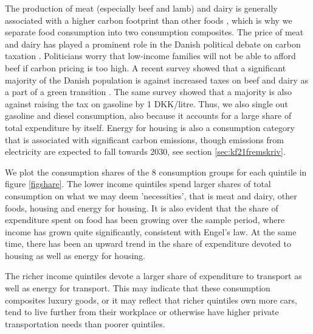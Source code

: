 The production of meat (especially beef and lamb) and dairy is generally associated with a higher carbon footprint than other foods \citep{denstoreklimadatabase}, which is why we separate food consumption into two consumption composites. The price of meat and dairy has played a prominent role in the Danish political debate on carbon taxation \citep{kodsovsellerkaos}.  Politicians worry that low-income families will not be able to afford beef if carbon pricing is too high. A recent survey showed that a significant majority of the Danish population is against increased taxes on beef and dairy as a part of a green transition \citep{megafonpolitiken}. The same survey showed that a majority is also against raising the tax on gasoline by 1 DKK/litre. Thus, we also single out gasoline and diesel consumption, also because it accounts for a large share of total expenditure by itself. Energy for housing is also a consumption category that is associated with significant carbon emissions, though emissions from electricity are expected to fall towards 2030, see section \ref{sec:kf21fremskriv}.

We plot the consumption shares of the 8 consumption groups for each quintile in figure \ref{figshare}. The lower income quintiles spend larger shares of total consumption on what we may deem 'necessities', that is meat and dairy, other foods, housing and energy for housing. It is also evident that the share of expenditure spent on food has been growing over the sample period, where income has grown quite significantly, consistent with Engel's law. At the same time, there has been an upward trend in the share of expenditure devoted to housing as well as energy for housing.

The richer income quintiles devote a larger share of expenditure to transport as well as energy for transport.  This may indicate that these consumption composites luxury goods, or it may reflect that richer quintiles own more cars, tend to live further from their workplace or otherwise have higher private transportation needs than poorer quintiles. 

